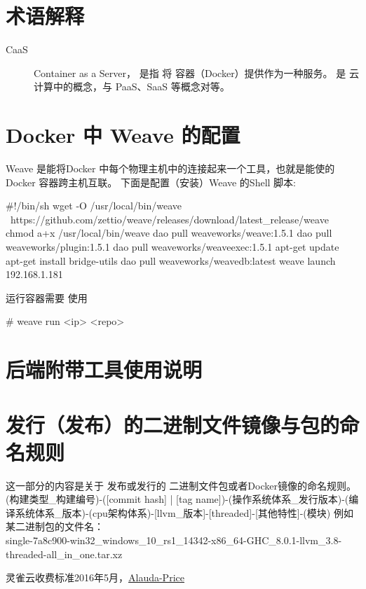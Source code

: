 \documentclass{dingo}
\begin{document}
  \newpage
  \begin{appendix}
  	\section{术语解释}
  	\label{section:term}
		\begin{description}
			\item[CaaS] Container as a Server， 是指 将 容器（Docker）提供作为一种服务。
				是 云计算中的概念，与 PaaS、SaaS 等概念对等。
		\end{description}

  	\section{Docker 中 Weave  的配置} %
  	\label{section:dockerNweave}
  	Weave 是能将Docker 中每个物理主机中的连接起来一个工具，也就是能使的 Docker 容器跨主机互联。
  	下面是配置（安装）Weave 的Shell 脚本:
  	\begin{bash}[caption=Weave 安装]
#!/bin/sh
wget -O /usr/local/bin/weave \
https://github.com/zettio/weave/releases/download/latest_release/weave
chmod a+x /usr/local/bin/weave
dao pull weaveworks/weave:1.5.1
dao pull weaveworks/plugin:1.5.1
dao pull weaveworks/weaveexec:1.5.1
apt-get update
apt-get install bridge-utils
dao pull weaveworks/weavedb:latest
weave launch 192.168.1.181
  	\end{bash}
  	运行容器需要 使用
  	\begin{shell}
# weave run <ip> <repo>
  	\end{shell}

	\section{后端附带工具使用说明}
    
    \section{发行（发布）的二进制文件镜像与包的命名规则}
    这一部分的内容是关于 发布或发行的 二进制文件包或者Docker镜像的命名规则。
    (构建类型\_构建编号)-([commit hash] | [tag name])-(操作系统体系\_发行版本)-(编译系统体系\_版本)-(cpu架构体系)-[llvm\_版本]-[threaded]-[其他特性]-(模块)
    例如某二进制包的文件名：\\
    single-7a8c900-win32\_windows\_10\_rs1\_14342-x86\_64-GHC\_8.0.1-llvm\_3.8-threaded-all\_in\_one.tar.xz

	  \begin{thebibliography}{}
		 	 灵雀云收费标准2016年5月，\href{http://www.alauda.cn/price/}{Alauda-Price}
		\end{thebibliography}
  \end{appendix}
\end{document}
